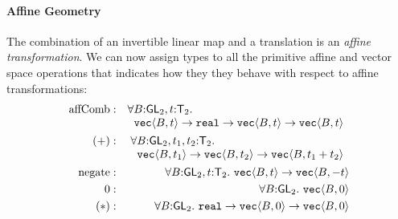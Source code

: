 \paragraph{Affine Geometry} The combination of an invertible linear
map and a translation is an \emph{affine transformation}. We can now
assign types to all the primitive affine and vector space operations
that indicates how they they behave with respect to affine
transformations:
\begin{eqnarray*}
  \mathrm{affComb} & : &
  \begin{array}[t]{@{}l}
    \forall B \mathord: \SynGL_2, t \mathord: \SynTransl_2.\\
    \hspace{0.2cm} \tyPrim{vec}{B,t} \to \tyPrimNm{real} \to \tyPrim{vec}{B,t} \to \tyPrim{vec}{B,t}
  \end{array}
  \\
  (+) & : &
  \begin{array}[t]{@{}l}
    \forall B \mathord: \SynGL_2, t_1,t_2 \mathord: \SynTransl_2. \\
    \hspace{0.2cm}\tyPrim{vec}{B,t_1} \to \tyPrim{vec}{B,t_2} \to \tyPrim{vec}{B,t_1 + t_2}
  \end{array}
  \\
  \mathrm{negate} & : & \forall B \mathord: \SynGL_2, t \mathord: \SynTransl_2.\ \tyPrim{vec}{B,t} \to \tyPrim{vec}{B,-t} \\
  0 & : & \forall B \mathord: \SynGL_2.\ \tyPrim{vec}{B,0} \\
  (*) & : & \forall B \mathord: \SynGL_2.\ \tyPrimNm{real} \to \tyPrim{vec}{B,0} \to \tyPrim{vec}{B,0}
\end{eqnarray*}

